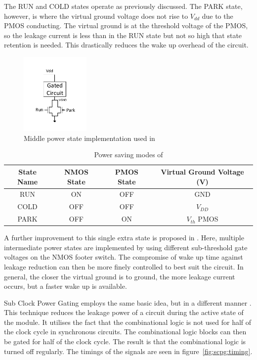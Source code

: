 The RUN and COLD states operate as previously discussed. 
The PARK state, however, is where the virtual ground voltage does not rise to $V_{dd}$ due to the PMOS conducting. 
The virtual ground is at the threshold voltage of the PMOS, so the leakage current is less than in the RUN state but not so high that state retention is needed. 
This drastically reduces the wake up overhead of the circuit. 
\begin{figure}
\centering
\includegraphics[width=0.3\textwidth]{Figures/powergating_kim.pdf}
\caption{Middle power state implementation used in \cite{kim2004experimental}}
\label{fig:kim}
\end{figure}

\begin{table}
\caption{Power saving modes of \cite{kim2004experimental}}
\label{tab:kim}
\centering
\begin{tabular}{|c|c|c|c|}\hline
State Name & NMOS State & PMOS State & Virtual Ground Voltage (V)\\ \hline
RUN  & ON   & OFF  & GND \\
COLD & OFF  & OFF  & $V_{DD}$ \\
PARK & OFF  & ON   & $V_{th}$ PMOS \\ \hline
\end{tabular}
\end{table}

A further improvement to this single extra state is proposed in \cite{singh2007enhanced}. 
Here, multiple intermediate power states are implemented by using different sub-threshold gate voltages on the NMOS footer switch. 
The compromise of wake up time against leakage reduction can then be more finely controlled to best suit the circuit.
In general, the closer the virtual ground is to ground, the more leakage current occurs, but a faster wake up is available. 

Sub Clock Power Gating employs the same basic idea, but in a different manner \cite{mistry2011sub}.
This technique reduces the leakage power of a circuit during the active state of the module.
It utilises the fact that the combinational logic is not used for half of the clock cycle in synchronous circuits.
The combinational logic blocks can then be gated for half of the clock cycle.
The result is that the combinational logic is turned off regularly. 
The timings of the signals are seen in figure~\ref{fig:scpg:timing}.

